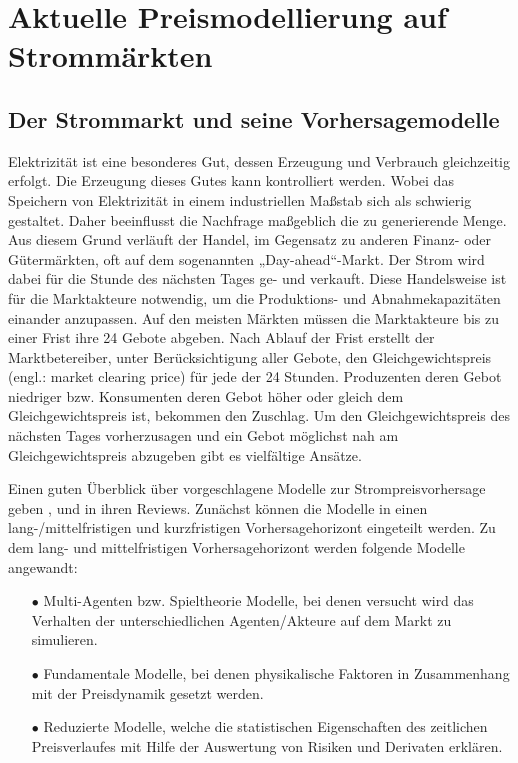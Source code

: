 

\section{Aktuelle Preismodellierung auf Strommärkten}


\subsection{Der Strommarkt und seine Vorhersagemodelle}

Elektrizität ist eine besonderes Gut, dessen Erzeugung und Verbrauch gleichzeitig erfolgt. Die Erzeugung dieses Gutes kann kontrolliert werden. Wobei das Speichern von Elektrizität in einem industriellen Maßstab sich als schwierig gestaltet. Daher beeinflusst die Nachfrage maßgeblich die zu generierende Menge. Aus diesem Grund verläuft der Handel, im Gegensatz zu anderen Finanz- oder Gütermärkten, oft auf dem sogenannten „Day-ahead“-Markt. Der Strom wird dabei für die Stunde des nächsten Tages ge- und verkauft. Diese Handelsweise ist für die Marktakteure notwendig, um die Produktions- und Abnahmekapazitäten einander anzupassen. Auf den meisten Märkten müssen die Marktakteure bis zu einer Frist ihre 24 Gebote abgeben. Nach Ablauf der Frist erstellt der Marktbetereiber, unter Berücksichtigung aller Gebote, den Gleichgewichtspreis (engl.: market clearing price) für jede der 24 Stunden. Produzenten deren Gebot niedriger bzw. Konsumenten deren Gebot höher oder gleich dem Gleichgewichtspreis ist, bekommen den Zuschlag. Um den Gleichgewichtspreis des nächsten Tages vorherzusagen und ein Gebot möglichst nah am Gleichgewichtspreis abzugeben gibt es vielfältige Ansätze.

Einen guten Überblick über vorgeschlagene Modelle zur Strompreisvorhersage geben \citet{Aggarwal2009}, \citet{Cerjan2013} und \citet{Weron2014} in ihren Reviews. Zunächst können die Modelle in einen lang-/mittelfristigen und kurzfristigen Vorhersagehorizont eingeteilt werden. Zu dem lang- und mittelfristigen Vorhersagehorizont werden folgende Modelle angewandt:
\begin{itemize}
\item[\textbf{$\bullet$}]%
Multi-Agenten bzw. Spieltheorie Modelle, bei denen versucht wird das Verhalten der unterschiedlichen Agenten/Akteure auf dem Markt zu simulieren.

\item[\textbf{$\bullet$}]%
Fundamentale Modelle, bei denen physikalische Faktoren in Zusammenhang mit der Preisdynamik gesetzt werden.

\item[\textbf{$\bullet$}]%
Reduzierte Modelle, welche die statistischen Eigenschaften des zeitlichen Preisverlaufes mit Hilfe der Auswertung von Risiken und Derivaten erklären.
\end{itemize}


